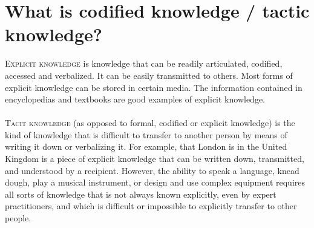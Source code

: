 \section{What is codified knowledge / tactic knowledge?}
\textsc{Explicit knowledge} is knowledge that can be readily articulated, codified, accessed and verbalized. It can be easily transmitted to others. Most forms of explicit knowledge can be stored in certain media. The information contained in encyclopedias and textbooks are good examples of explicit knowledge. \\
\\
\textsc{Tacit knowledge} (as opposed to formal, codified or explicit knowledge) is the kind of knowledge that is difficult to transfer to another person by means of writing it down or verbalizing it. For example, that London is in the United Kingdom is a piece of explicit knowledge that can be written down, transmitted, and understood by a recipient. However, the ability to speak a language, knead dough, play a musical instrument, or design and use complex equipment requires all sorts of knowledge that is not always known explicitly, even by expert practitioners, and which is difficult or impossible to explicitly transfer to other people.

















